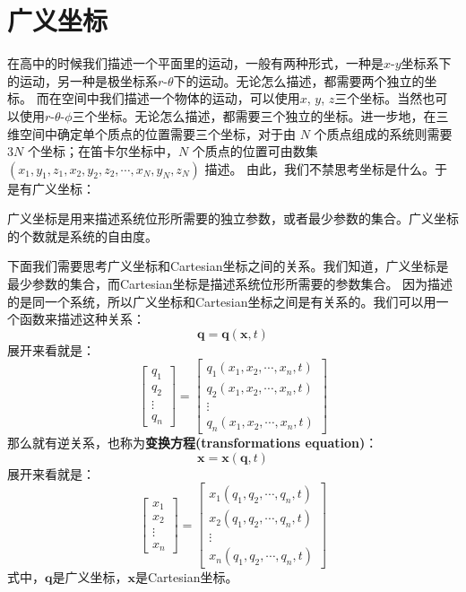 \section{广义坐标}
在高中的时候我们描述一个平面里的运动，一般有两种形式，一种是$x$-$y$坐标系下的运动，另一种是极坐标系$r$-$\theta$下的运动。无论怎么描述，都需要两个独立的坐标。 而在空间中我们描述一个物体的运动，可以使用$x$, $y$, $z$三个坐标。当然也可以使用$r$-$\theta$-$\phi$三个坐标。无论怎么描述，都需要三个独立的坐标。进一步地，在三维空间中确定单个质点的位置需要三个坐标，对于由 $N$ 个质点组成的系统则需要 $3N$ 个坐标；在笛卡尔坐标中，$N$ 个质点的位置可由数集 $(x_1, y_1, z_1, x_2, y_2, z_2, \cdots, x_N, y_N, z_N)$ 描述。
由此，我们不禁思考坐标是什么。于是有广义坐标：
\begin{definition}[广义坐标]
广义坐标是用来描述系统位形所需要的独立参数，或者最少参数的集合。广义坐标的个数就是系统的自由度。
\end{definition}
下面我们需要思考广义坐标和Cartesian坐标之间的关系。我们知道，广义坐标是最少参数的集合，而Cartesian坐标是描述系统位形所需要的参数集合。 因为描述的是同一个系统，所以广义坐标和Cartesian坐标之间是有关系的。我们可以用一个函数来描述这种关系：
\[
\boldsymbol{q} = \boldsymbol{q}(\boldsymbol{x},t)
\]
展开来看就是：
\[
\begin{bmatrix} q_1 \\ q_2 \\ \vdots \\ q_n \end{bmatrix} = \begin{bmatrix} q_1(x_1,x_2,\cdots,x_n,t) \\ q_2(x_1,x_2,\cdots,x_n,t) \\ \vdots \\ q_n(x_1,x_2,\cdots,x_n,t) \end{bmatrix}
\]
那么就有逆关系，也称为\textbf{变换方程(transformations equation)}：
\[
\boldsymbol{x} = \boldsymbol{x}(\boldsymbol{q},t)
\]
展开来看就是：
\[
\begin{bmatrix} x_1 \\ x_2 \\ \vdots \\ x_n \end{bmatrix} = \begin{bmatrix} x_1(q_1,q_2,\cdots,q_n,t) \\ x_2(q_1,q_2,\cdots,q_n,t) \\ \vdots \\ x_n(q_1,q_2,\cdots,q_n,t) \end{bmatrix}
\]
式中，$\boldsymbol{q}$是广义坐标，$\boldsymbol{x}$是Cartesian坐标。
